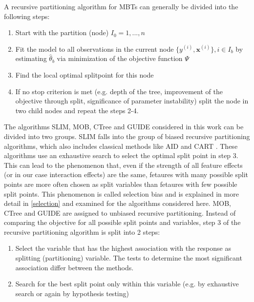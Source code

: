 A recursive partitioning algorithm for MBTs can generally be divided into the following steps:
\begin{enumerate}
    \item Start with the partition (node) $I_0 = 1,...,n$
    \item Fit the model to all observations in the current node $\{y^{(i)}, \mathbf{x}^{(i)}\}, i \in I_b$ by estimating $\hat{\theta}_b$ via minimization of the objective function $\Psi$
    \item Find the local optimal splitpoint for this node 
    \item If no stop criterion is met (e.g. depth of the tree, improvement of the objective through split, significance of parameter instability) split the node in two child nodes and repeat the steps 2-4.
\end{enumerate}


The algorithms SLIM, MOB, CTree and GUIDE considered in this work can be divided into two groups. SLIM falls into the group of biased recursive partitioning algorithms, which also includes classical methods like AID \citep{Morgan.1963} and CART \citep{Breiman.1984}. These algorithms use an exhaustive search to select the optimal split point in step 3. This can lead to the phenomenon that, even if the strength of all feature effects (or in our case interaction effects) are the same, fetaures with many possible split points are more often chosen as split variables than fetaures with few possible split points. This phenomenon is called selection bias and is explained in more detail in \ref{selection} and examined for the algorithms considered here.
MOB, CTree and GUIDE are assigned to unbiased recursive partitioning. Instead of comparing the objective for all possible split points and variables, step 3 of the recursive partitioning algorithm is split into 2 steps:

\begin{enumerate}
    \item Select the variable that has the highest association with the response as splitting (partitioning) variable. The tests to determine the most significant association differ between the methods.
    \item Search for the best split point only within this variable (e.g. by exhaustive search or again by hypothesis testing)
\end{enumerate}

\citep{Schlosser.2019}



